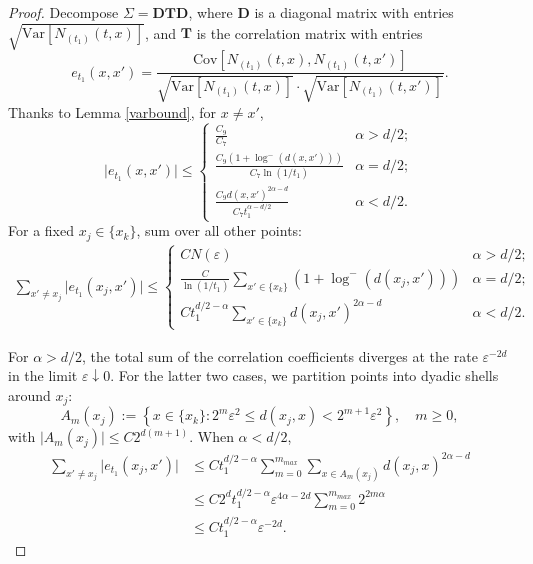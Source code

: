 \documentclass[12pt]{amsart}
\numberwithin{equation}{section}
\newcommand{\1}{\mathbf{1}}
\begin{document}
\begin{proof}
Decompose $\Sigma=\textbf{D}\textbf{T}\textbf{D}$, where $\textbf{D}$ is a diagonal matrix with entries $\sqrt{\textrm{Var}[N_{(t_1)}(t,x)]}$, and $\textbf{T}$ is the correlation matrix with entries
\[e_{t_1}(x,x')=\frac{\textrm{Cov}[N_{(t_1)}(t,x),N_{(t_1)}(t,x')]}{\sqrt{\textrm{Var}[N_{(t_1)}(t,x)]}\cdot\sqrt{\textrm{Var}[N_{(t_1)}(t,x')]}}.\]
Thanks to Lemma \ref{varbound}, for $x\neq x'$,
\[\vert e_{t_1}(x,x')\vert\leq \begin{cases}
    \frac{C_9}{C_7} & \alpha>d/2;\\
    \frac{C_9(1+\log^-(d(x,x')))}{C_7\ln(1/t_1)} & \alpha = d/2;\\
    \frac{C_9d(x,x')^{2\alpha-d}}{C_7t_1^{\alpha-d/2}} & \alpha < d/2.
\end{cases}\]
For a fixed $x_j\in\{x_k\}$, sum over all other points:
\begin{equation*}
\begin{split}
    \sum_{x'\neq x_j}\vert e_{t_1}(x_j,x')\vert\leq\begin{cases}
CN(\varepsilon)&\alpha>d/2;\\
\frac{C}{\ln(1/t_1)}\sum\limits_{x'\in\{x_k\}}(1+\log^-(d(x_j,x')))&\alpha=d/2;\\
Ct_1^{d/2-\alpha}\sum\limits_{x'\in\{x_k\}}d(x_j,x')^{2\alpha-d}&\alpha<d/2.
\end{cases}
\end{split}
\end{equation*}

For $\alpha>d/2$, the total sum of the correlation coefficients diverges at the rate $\varepsilon^{-2d}$ in the limit $\varepsilon\downarrow0$. For the latter two cases, we partition points into dyadic shells around $x_j$:
\begin{equation*}
    A_m(x_j):=\left\lbrace x\in\{x_k\}:2^m\varepsilon^2\leq d(x_j,x)<2^{m+1}\varepsilon^2\right\rbrace, \quad m\geq 0,
\end{equation*}
with $\vert A_m(x_j)\vert\leq C2^{d(m+1)}$. When $\alpha<d/2$,
\begin{equation*}
    \begin{split}
        \sum_{x'\neq x_j}\vert e_{t_1}(x_j,x')\vert&\leq Ct_1^{d/2-\alpha}\sum_{m=0}^{m_{max}}\sum_{x\in A_m(x_j)}d(x_j,x)^{2\alpha-d}\\
        &\leq C2^dt_1^{d/2-\alpha}\varepsilon^{4\alpha-2d}\sum_{m=0}^{m_{max}}2^{2m\alpha}\\
        &\leq Ct_1^{d/2-\alpha}\varepsilon^{-2d}.
    \end{split}
\end{equation*}


\end{proof}
\end{document}

